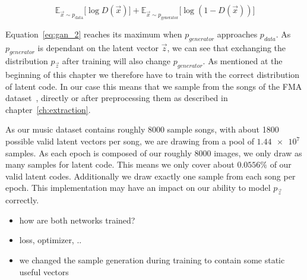             \begin{equation}
                \mathbb{E}_{\vec{x} \sim p_{\text{data}}}
                    \bigl[ \log D(\vec{x}) \bigr] +
                \mathbb{E}_{\vec{x} \sim p_{\text{generator}}}
                    \bigl[ \log \left( 1 - D(\vec{x}) \right) \bigr]
                \label{eq:gan_2}
            \end{equation}

            Equation~\ref{eq:gan_2} reaches its maximum when $p_{generator}$ approaches $p_{data}$. As $p_{generator}$ is dependant on the latent vector $\vec{z}$, we can see that exchanging the distribution $p_{\vec{z}}$ after training will also change $p_{generator}$. As mentioned at the beginning of this chapter we therefore have to train with the correct distribution of latent code. In our case this means that we sample from the songs of the FMA dataset~\cite{FMA}, directly or after preprocessing them as described in chapter~\ref{ch:extraction}.

            As our music dataset contains roughly 8000 sample songs, with about 1800 possible valid latent vectors per song, we are drawing from a pool of $\num{1.44e7}$ samples. As each epoch is composed of our roughly 8000 images, we only draw as many samples for latent code. This means we only cover about $0.0556\%$ of our valid latent codes. Additionally we draw exactly one sample from each song per epoch. This implementation may have an impact on our ability to model $p_{\vec{z}}$ correctly.

            \vspace{3cm}

            \begin{itemize}
                \item how are both networks trained?
                \item loss, optimizer, ..
                \item we changed the sample generation during training to contain some static useful vectors
            \end{itemize}

